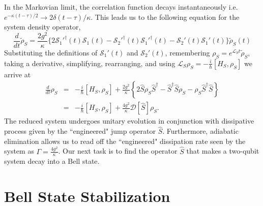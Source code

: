 In the Markovian limit, the correlation function decays instantaneously i.e. $e^{ - \kappa ( t - \tau ) / 2} \rightarrow  2 \delta( t - \tau ) / \kappa$. This leads us to the following equation \cite{StatMethQOI,StatMethQOII} for the system density operator,
\begin{equation}
\frac{d}{dt } \tilde{\rho}_S = \frac{2 g^2}{\kappa} \lbrace 2 \mathcal{S}_1'^{\dagger}(t) \mathcal{S}_1(t) - \mathcal{S}_2'^{\dagger}(t) \mathcal{S}_1'^{\dagger}(t) - \mathcal{S}_2'(t) \mathcal{S}_1'(t) \rbrace \tilde{\rho}_S(t)
\end{equation}
Substituting the definitions of $\mathcal{S}_1'(t)$ and $\mathcal{S}_2'(t)$,
remembering $\rho_S = e^{\mathcal{L}_S t }\tilde{\rho}_S$, taking a derivative, simplifying, rearranging, and using $\mathcal{L}_S\rho_S = - \frac{i}{\hbar} [ H_S, \rho_S ]$ we arrive at
\begin{eqnarray} \label{Engineered Reduced System}
\frac{d}{d t} \rho_S & = & - \frac{i}{\hbar} [ H_S, \rho_S ] + \frac{2 g^2}{\kappa} \left\lbrace 2 \hat{S} \rho_S \hat{S}^{\dagger} - \hat{S}^{\dagger} \hat{S} \rho_S - \rho_S \hat{S}^{\dagger} \hat{S} \right\rbrace \nonumber \\
& = & - \frac{i}{\hbar} [H_S, \rho_S] + \frac{4 g^2}{\kappa} \mathcal{D}[\hat{S}] \rho_S.
\end{eqnarray}
The reduced system undergoes unitary evolution in conjunction with dissipative process given by the ``engineered" jump operator $\hat{S}$. Furthermore, adiabatic elimination allows us to read off the ``engineered" dissipation rate seen by the system as $\Gamma = \frac{4 g^2}{\kappa}$. Our next task is to find the operator $\hat{S}$ that makes a two-qubit system decay into a Bell state.
%
\section{Bell State Stabilization}
%

